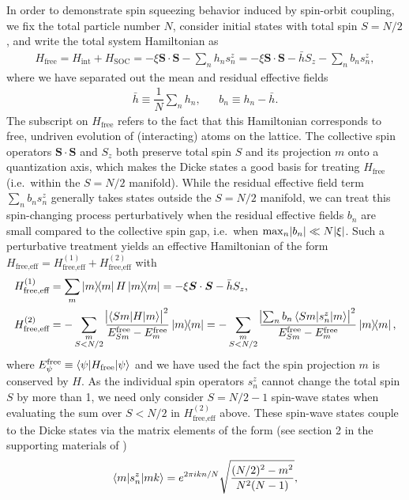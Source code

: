 \documentclass[aps,notitlepage,nofootinbib,11pt]{revtex4-1}
\renewcommand{\t}{\text} %
\newcommand{\f}[2]{\dfrac{#1}{#2}} %
\renewcommand{\v}{\bm} %
\renewcommand{\c}{\cdot} %
\newcommand{\bk}{\braket} %
\newcommand{\1}{\hat{\mathds{1}}}
\begin{document}
In order to demonstrate spin squeezing behavior induced by spin-orbit
coupling, we fix the total particle number $N$, consider initial
states with total spin $S=N/2$, and write the total system Hamiltonian
as
\begin{align}
  H_{\t{free}} = H_{\t{int}} + H_{\t{SOC}}
  = -\xi\v S\c\v S - \sum_n h_n s_n^z
  = -\xi\v S\c\v S - \bar h S_z - \sum_n b_n s_n^z,
\end{align}
where we have separated out the mean and residual effective fields
\begin{align}
  \bar h \equiv \f1N \sum_n h_n,
  &&
  b_n \equiv h_n - \bar h.
\end{align}
The subscript on $H_{\t{free}}$ refers to the fact that this
Hamiltonian corresponds to free, undriven evolution of (interacting)
atoms on the lattice.  The collective spin operators $\v S\c\v S$ and
$S_z$ both preserve total spin $S$ and its projection $m$ onto a
quantization axis, which makes the Dicke states a good basis for
treating $H_{\t{free}}$ (i.e.~within the $S=N/2$ manifold).  While the
residual effective field term $\sum_n b_n s_n^z$ generally takes
states outside the $S=N/2$ manifold, we can treat this spin-changing
process perturbatively when the residual effective fields $b_n$ are
small compared to the collective spin gap, i.e.~when
$\max_n\abs{b_n}\ll N\abs{\xi}$.  Such a perturbative treatment yields
an effective Hamiltonian of the form
$H_{\t{free,eff}} = H_{\t{free,eff}}^{(1)} + H_{\t{free,eff}}^{(2)}$
with
\begin{align}
  H_{\t{free,eff}}^{(1)}
  &= \sum_m \op{m} H \op{m}
  = -\xi \v S \c \v S - \bar h S_z, \\
  H_{\t{free,eff}}^{(2)}
  &= -\sum_{\substack{m\\S<N/2}}
  \frac{\abs{\bk{Sm|H|m}}^2}{E_{Sm}^{\t{free}}-E_m^{\t{free}}} \op{m}
  = -\sum_{\substack{m\\S<N/2}}
  \frac{\abs{\sum_n b_n \bk{Sm|s_n^z|m}}^2}
  {E_{Sm}^{\t{free}}-E_m^{\t{free}}} \op{m},
\end{align}
where $E_\psi^{\t{free}}\equiv\bk{\psi|H_{\t{free}}|\psi}$ and we have
used the fact the spin projection $m$ is conserved by $H$.  As the
individual spin operators $s_n^z$ cannot change the total spin $S$ by
more than 1, we need only consider $S=N/2-1$ spin-wave states when
evaluating the sum over $S<N/2$ in $H_{\t{free,eff}}^{(2)}$ above.
These spin-wave states couple to the Dicke states via the matrix
elements of the form (see section 2 in the supporting materials of
\cite{swallows2011suppression})
\begin{align}
  \bk{m|s_n^z|mk} = e^{2\pi i k n/N} \sqrt{\f{(N/2)^2-m^2}{N^2 (N-1)}},
\end{align}
\end{document}
